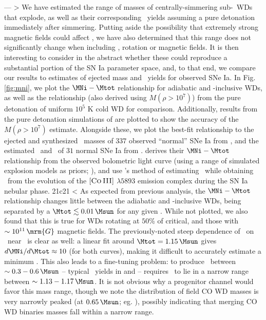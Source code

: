 ---
> We have estimated the range of masses of centrally-simmering sub-\Mch\ WDs that explode, as well as their corresponding \MNi\ yields assuming a pure detonation immediately after simmering.  Putting aside the possibility that extremely strong magnetic fields could affect \vconv, we have also determined that this range does not significantly change when including \dnabconv, rotation or magnetic fields.  It is then interesting to consider in the abstract whether these could reproduce a substantial portion of the SN Ia parameter space, and, to that end, we compare our results to estimates of ejected mass and \Ni\ yields for observed SNe Ia.  In Fig. \ref{fig:mni}, we plot the $\MNi-\Mtot$ relationship for adiabatic and \dnabconv-inclusive WDs, as well as the relationship (also derived using $M(\rho>10^7)$) from the pure detonation of uniform $10^5$ K cold WD for comparison.  Additionally, results from the pure detonation simulations of \cite{sim+10} are plotted to show the accuracy of the $M(\rho>10^7)$ estimate.  Alongside these, we plot the best-fit relationship to the ejected and synthesized \Ni\ masses of $337$ observed ``normal'' \citep{bran+06} SNe Ia from \cite{scalzrs14}, and the estimated \Mtot\ and \MNi\ of $31$ normal SNe Ia from \cite{chil+15}.  \cite{scalzrs14} derives their $\MNi-\Mtot$ relationship from the observed bolometric light curve (using a range of simulated explosion models as priors; \citealt{scalz+14}), and \cite{chil+15} use \cite{scalzrs14}'s method of estimating \Mtot\ while obtaining \MNi\ from the evolution of the $[\textsc{Co\,III}]$ $\lambda5893$ emission complex during the SN Ia nebular phase.
21c21
< As expected from previous analysis, the $\MNi-\Mtot$ relationship changes little between the adiabatic and \dnabconv-inclusive WDs, being separated by a $\Mtot\lesssim0.01\,\Msun$ for any given \MNi.  While not plotted, we also found that this is true for WDs rotating at $50$\% of critical, and those with $\sim10^{11}\,\mrm{G}$ magnetic fields.  The previously-noted steep dependence of \MNi\ on \Mtot\ near \Mcrit\ is clear as well: a linear fit around $\Mtot = 1.15\,\Msun$ gives $d\MNi/d\Mtot \approx 10$ (for both curves), making it difficult to accurately estimate a minimum \MNi.  This also leads to a fine-tuning problem: to produce \MNi\ between $\sim0.3-0.6\,\Msun$ -- typical \MNi\ yields in \cite{scalzrs14} and \cite{chil+15} -- requires \Mtot\ to lie in a narrow range between $\sim 1.13 - 1.17\,\Msun$.  It is not obvious why a progenitor channel would favor this mass range, though we note the distribution of field CO WD masses is very narrowly peaked (at $0.65\,\Msun$; eg. \citealt{tremb09, klei+13}), possibly indicating that merging CO WD binaries masses fall within a narrow range.
